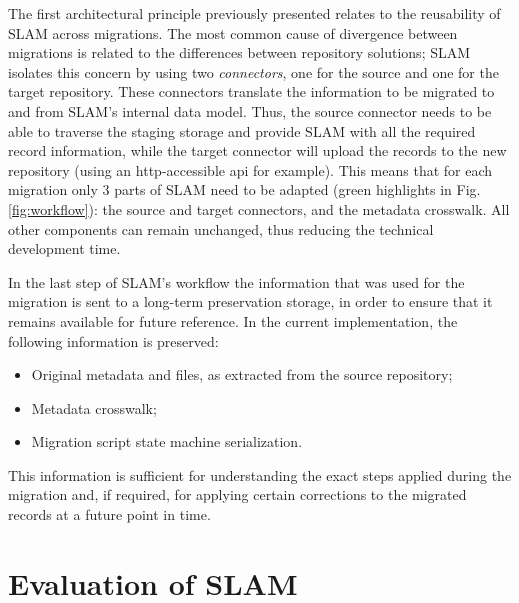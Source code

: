The first architectural principle previously presented relates to the reusability of SLAM across migrations. The most common cause of divergence between migrations is related to the differences between repository solutions; SLAM isolates this concern by using two \emph{connectors}, one for the source and one for the target repository. These connectors translate the information to be migrated to and from SLAM's internal data model. Thus, the source connector needs to be able to traverse the staging storage and provide SLAM with all the required record information, while the target connector will upload the records to the new repository (using an \gls{http}-accessible \gls{api} for example). This means that for each migration only 3 parts of SLAM need to be adapted (green highlights in Fig. \ref{fig:workflow}): the source and target connectors, and the metadata crosswalk. All other components can remain unchanged, thus reducing the technical development time.

In the last step of SLAM's workflow the information that was used for the migration is sent to a long-term preservation storage, in order to ensure that it remains available for future reference. In the current implementation, the following information is preserved:
\begin{itemize}
    \item Original metadata and files, as extracted from the source repository;
    \item Metadata crosswalk;
    \item Migration script state machine serialization.
\end{itemize}
This information is sufficient for understanding the exact steps applied during the migration and, if required, for applying certain corrections to the migrated records at a future point in time.


\section{Evaluation of SLAM}
\label{sec:eval}

